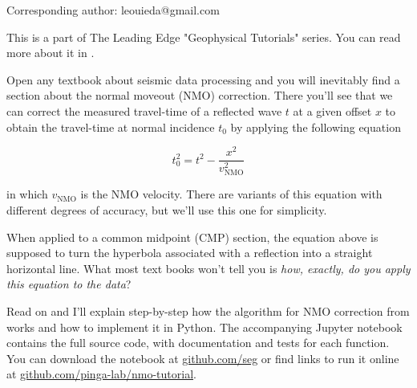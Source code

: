 Corresponding author: leouieda@gmail.com

This is a part of The Leading Edge "Geophysical Tutorials" series.
You can read more about it in \citet{Hall_2016a}.

Open any textbook about seismic data processing and you will inevitably find a
section about the normal moveout (NMO) correction.
There you'll see that we can correct the measured travel-time of a reflected
wave $t$ at a given offset $x$ to obtain the travel-time at normal
incidence $t_0$ by applying the following equation 

\begin{equation}
t_0^2=t^2-\dfrac{x^2}{v_\mathrm{NMO}^2}
\label{eq:traveltime}
\end{equation}

in which $v_\mathrm{NMO}$ is the NMO velocity.
There are variants of this equation with different degrees of accuracy, 
but we'll use this one for simplicity.

When applied to a common midpoint (CMP) section, the equation above is
supposed to turn the hyperbola associated with a reflection into a straight
horizontal line.
What most text books won't tell you is \textit{how, exactly, do you apply this
equation to the data}?

Read on and I'll explain step-by-step how the algorithm for NMO correction from
\citet{Yilmaz_2001} works and how to implement it in Python.
The accompanying Jupyter notebook \citep{Perez_2007} contains the full source
code, with documentation and tests for each function.
You can download the notebook at
\href{https://github.com/seg}{github.com/seg} or
find links to run it online at
\href{https://github.com/pinga-lab/nmo-tutorial}{github.com/pinga-lab/nmo-tutorial}.
